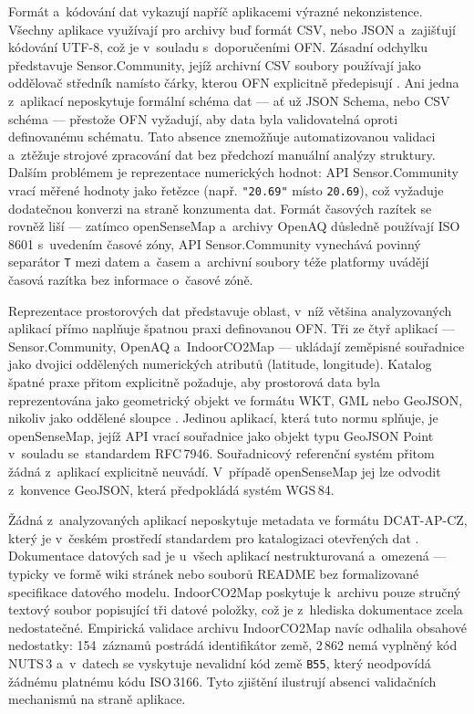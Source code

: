 Formát a~kódování dat vykazují napříč aplikacemi výrazné nekonzistence. Všechny aplikace využívají pro archivy buď formát CSV, nebo JSON a~zajišťují kódování UTF-8, což je v~souladu s~doporučeními OFN. Zásadní odchylku představuje Sensor.Community, jejíž archivní CSV soubory používají jako oddělovač středník namísto čárky, kterou OFN explicitně předepisují \parencite{PrikladySpatnePraxe2022}. Ani jedna z~aplikací neposkytuje formální schéma dat --- ať už JSON Schema, nebo CSV schéma --- přestože OFN vyžadují, aby data byla validovatelná oproti definovanému schématu. Tato absence znemožňuje automatizovanou validaci a~ztěžuje strojové zpracování dat bez předchozí manuální analýzy struktury. Dalším problémem je reprezentace numerických hodnot: API Sensor.Community vrací měřené hodnoty jako řetězce (např. \texttt{"20.69"} místo \texttt{20.69}), což vyžaduje dodatečnou konverzi na straně konzumenta dat. Formát časových razítek se rovněž liší --- zatímco openSenseMap a~archivy OpenAQ důsledně používají ISO\,8601 s~uvedením časové zóny, API Sensor.Community vynechává povinný separátor \texttt{T} mezi datem a~časem a~archivní soubory téže platformy uvádějí časová razítka bez informace o~časové zóně.

Reprezentace prostorových dat představuje oblast, v~níž většina analyzovaných aplikací přímo naplňuje špatnou praxi definovanou OFN. Tři ze čtyř aplikací --- Sensor.Community, OpenAQ a~IndoorCO2Map --- ukládají zeměpisné souřadnice jako dvojici oddělených numerických atributů (latitude, longitude). Katalog špatné praxe přitom explicitně požaduje, aby prostorová data byla reprezentována jako geometrický objekt ve formátu WKT, GML nebo GeoJSON, nikoliv jako oddělené sloupce \parencite{PrikladySpatnePraxe2022}. Jedinou aplikací, která tuto normu splňuje, je openSenseMap, jejíž API vrací souřadnice jako objekt typu GeoJSON Point v~souladu se~standardem RFC\,7946. Souřadnicový referenční systém přitom žádná z~aplikací explicitně neuvádí. V~případě openSenseMap jej lze odvodit z~konvence GeoJSON, která předpokládá systém WGS\,84.

Žádná z~analyzovaných aplikací neposkytuje metadata ve formátu DCAT-AP-CZ, který je v~českém prostředí standardem pro katalogizaci otevřených dat \parencite{DCATAPCZRozhraniKatalogu}. Dokumentace datových sad je u~všech aplikací nestrukturovaná a~omezená --- typicky ve formě wiki stránek nebo souborů README bez formalizované specifikace datového modelu. IndoorCO2Map poskytuje k~archivu pouze stručný textový soubor popisující tři datové položky, což je z~hlediska dokumentace zcela nedostatečné. Empirická validace archivu IndoorCO2Map navíc odhalila obsahové nedostatky: 154~záznamů postrádá identifikátor země, 2\,862 nemá vyplněný kód NUTS\,3 a~v~datech se vyskytuje nevalidní kód země \texttt{B55}, který neodpovídá žádnému platnému kódu ISO\,3166. Tyto zjištění ilustrují absenci validačních mechanismů na straně aplikace.

